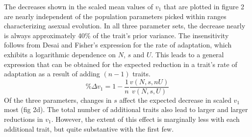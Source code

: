 \documentclass[11pt,twocolumn]{article}
\begin{document}
The decreases shown in the scaled mean values of $v_1$ that are plotted in figure 2 are nearly independent of the population parameters picked within ranges characterizing asexual evolution. In all three parameter sets, the decrease nearly is always approximately 40\% of the trait's prior variance. The insensitivity follows from Desai and Fisher's expression for the rate of adaptation, which exhibits a logarithmic dependence on $N$, $s$ and $U$. This leads to a general expression that can be obtained for the expected reduction in a trait's rate of adaptation as a result of adding  $(n-1)$ traits.
\[
\% \Delta v_1 
= 1-\frac{1}{n}\frac{v(N,s,nU)}{v(N,s,U)}
\]
Of the three parameters, changes in $s$ affect the expected decrease in scaled $v_1$ most (fig 2d). The total number of additional traits also lead to larger and larger reductions in $v_1$. However, the extent of this effect is marginally less with each additional trait, but quite substantive with the first few. \par
\end{document}
